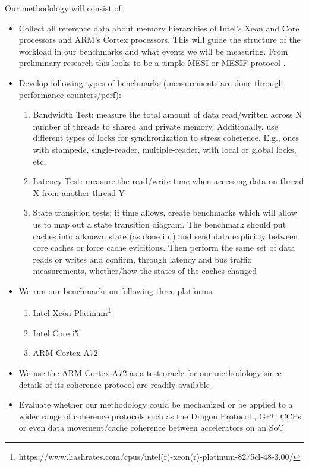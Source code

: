 \documentclass[11pt]{article}
\begin{document}
Our methodology will consist of:
\begin{itemize}
    \item Collect all reference data about memory hierarchies of Intel's Xeon and Core processors and ARM's Cortex processors. This will guide the structure of the workload in our benchmarks and what events we will be measuring. From preliminary research this looks to be a simple MESI or MESIF protocol \cite{molka2009memory,molka2015cache}.
    \item Develop following types of benchmarks (measurements are done through performance counters/perf):
    \begin{enumerate}
        \item Bandwidth Test: measure the total amount of data read/written across N number of threads to shared and private memory. Additionally, use different types of locks for synchronization to stress coherence. E.g., ones with stampede, single-reader, multiple-reader, with local or global locks, etc.
        \item Latency Test: measure the read/write time when accessing data on thread X from another thread Y
        \item State transition tests: if time allows, create benchmarks which will allow us to map out a state transition diagram. The benchmark should put caches into a known state (as done in \cite{molka2009memory}) and send data explicitly between core caches or force cache evicitions. Then perform the same set of data reads or writes and confirm, through latency and bus traffic measurements, whether/how the states of the caches changed
    \end{enumerate}
    \item We run our benchmarks on following three platforms:
    \begin{enumerate}
        \item Intel Xeon Platinum\footnote{https://www.hashrates.com/cpus/intel(r)-xeon(r)-platinum-8275cl-48-3.00/}
        \item Intel Core i5\cite{lempel20112nd}
        \item ARM Cortex-A72\cite{armcortex}
    \end{enumerate}
    \item We use the ARM Cortex-A72 as a test oracle for our methodology since details of its coherence protocol are readily available
    \item Evaluate whether our methodology could be mechanized or be applied to a wider range of coherence protocols such as the Dragon Protocol \cite{atkinson1987dragon}, GPU CCPs \cite{singh2013cache} or even data movement/cache coherence between accelerators on an SoC \cite{boroumand2018google}
\end{itemize}
\end{document}
